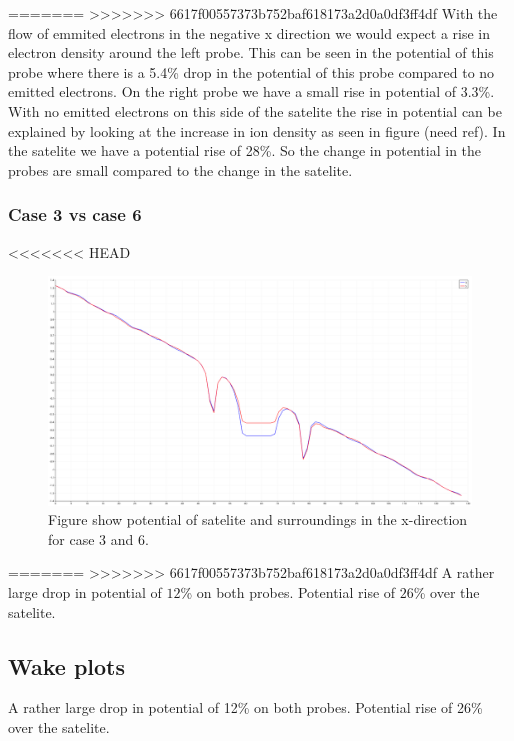 =======
>>>>>>> 6617f00557373b752baf618173a2d0a0df3ff4df
With the flow of emmited electrons in the negative x direction we would expect a rise in electron density around the left probe.
This can be seen in the potential of this probe where there is a 5.4\% drop in the potential of this probe compared to no emitted
electrons. On the right probe we have a small rise in potential of 3.3\%. With no emitted electrons on this side of the satelite the rise in
potential can be explained by looking at the increase in ion density as seen in figure (need ref).
In the satelite we have a potential rise of 28\%. So the change in potential in the probes are small compared to the change in the satelite.

\subsubsection{Case 3 vs case 6}

<<<<<<< HEAD
\begin{figure}
    \includegraphics[width = 0.5 \textwidth]{images/pot_case36.png}
    \caption{Figure show potential of satelite and surroundings in the x-direction for case 3 and 6.}
\end{figure}

=======
>>>>>>> 6617f00557373b752baf618173a2d0a0df3ff4df
A rather large drop in potential of \( 12\)\% on both probes. Potential rise of \(26\)\% over the satelite.

\subsection{Wake plots}

A rather large drop in potential of 12\% on both probes. Potential rise of 26\% over the satelite.

